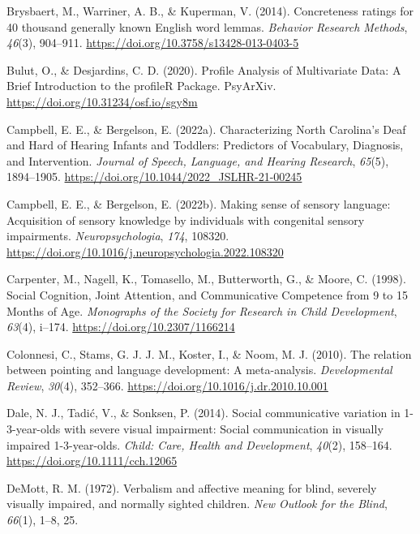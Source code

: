 \documentclass[
  man,floatsintext]{apa6}
\newlength{\cslhangindent}
\newlength{\cslentryspacingunit} %
\newenvironment{CSLReferences}[2] %
 {%
  \setlength{\parindent}{0pt}
  \ifodd #1
  \let\oldpar\par
  \def\par{\hangindent=\cslhangindent\oldpar}
  \fi
  \setlength{\parskip}{#2\cslentryspacingunit}
 }%
 {}
\begin{document}
\begin{CSLReferences}{1}{0}
\leavevmode{}%
Brysbaert, M., Warriner, A. B., \& Kuperman, V. (2014). Concreteness ratings for 40 thousand generally known {English} word lemmas. \emph{Behavior Research Methods}, \emph{46}(3), 904--911. \url{https://doi.org/10.3758/s13428-013-0403-5}

\leavevmode{}%
Bulut, O., \& Desjardins, C. D. (2020). Profile {Analysis} of {Multivariate Data}: {A Brief Introduction} to the {profileR Package}. {PsyArXiv}. \url{https://doi.org/10.31234/osf.io/sgy8m}

\leavevmode{}%
Campbell, E. E., \& Bergelson, E. (2022a). Characterizing {North Carolina}'s {Deaf} and {Hard} of {Hearing Infants} and {Toddlers}: {Predictors} of {Vocabulary}, {Diagnosis}, and {Intervention}. \emph{Journal of Speech, Language, and Hearing Research}, \emph{65}(5), 1894--1905. \url{https://doi.org/10.1044/2022_JSLHR-21-00245}

\leavevmode{}%
Campbell, E. E., \& Bergelson, E. (2022b). Making sense of sensory language: {Acquisition} of sensory knowledge by individuals with congenital sensory impairments. \emph{Neuropsychologia}, \emph{174}, 108320. \url{https://doi.org/10.1016/j.neuropsychologia.2022.108320}

\leavevmode{}%
Carpenter, M., Nagell, K., Tomasello, M., Butterworth, G., \& Moore, C. (1998). Social {Cognition}, {Joint Attention}, and {Communicative Competence} from 9 to 15 {Months} of {Age}. \emph{Monographs of the Society for Research in Child Development}, \emph{63}(4), i--174. \url{https://doi.org/10.2307/1166214}

\leavevmode{}%
Colonnesi, C., Stams, G. J. J. M., Koster, I., \& Noom, M. J. (2010). The relation between pointing and language development: {A} meta-analysis. \emph{Developmental Review}, \emph{30}(4), 352--366. \url{https://doi.org/10.1016/j.dr.2010.10.001}

\leavevmode{}%
Dale, N. J., Tadić, V., \& Sonksen, P. (2014). Social communicative variation in 1-3-year-olds with severe visual impairment: {Social} communication in visually impaired 1-3-year-olds. \emph{Child: Care, Health and Development}, \emph{40}(2), 158--164. \url{https://doi.org/10.1111/cch.12065}

\leavevmode{}%
DeMott, R. M. (1972). Verbalism and affective meaning for blind, severely visually impaired, and normally sighted children. \emph{New Outlook for the Blind}, \emph{66}(1), 1--8, 25.


\end{CSLReferences}
\end{document}
